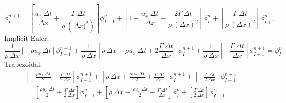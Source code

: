 \documentclass[12pt]{article}
\begin{document}
\begin{equation*}
    \phi_{I}^{n+1} = \left[ \frac{u_x\: \Delta t}{\Delta x} + \frac{\Gamma\: \Delta t}{\rho\: \left(\Delta x)^2\right)} \right] \phi_{I-1}^{n} + \left[ 1 - \frac{u_x\: \Delta t}{\Delta x} - \frac{2\Gamma\: \Delta t}{\rho\: \left(\Delta x\right)^2} \right] \phi_{I}^{n} + \left[ \frac{\Gamma\:\Delta t}{\rho\: \left(\Delta x\right)^2} \right]\phi_{I+1}^{n}
\end{equation*}
Implicit Euler:
\begin{equation*}
    \frac{1}{\rho \:\Delta x}\left[ -\rho u_x\: \Delta t \right]\phi_{I-1}^{n+1} + \frac{1}{\rho \:\Delta x}\left[ \rho \:\Delta x + \rho u_x\: \Delta t + 2\frac{\Gamma\: \Delta t}{\Delta x} \right]\phi_{I}^{n+1} + \frac{1}{\rho \:\Delta x}\left[ -\frac{\Gamma\: \Delta t}{\Delta x} \right]\phi_{I+1}^{n+1} = \phi_{I}^{n}
\end{equation*}
Trapezoidal:
\begin{multline*}
    \left[ -\frac{\rho u_x\: \Delta t}{2} - \frac{\Gamma\: \Delta t}{2\: \Delta x} \right]\phi_{I-1}^{n+1} + \left[ \rho \:\Delta x + \frac{\rho u_x\: \Delta t}{2} + \frac{\Gamma\: \Delta t}{\Delta x} \right]\phi_{I}^{n+1} + \left[ -\frac{\Gamma\: \Delta t}{2\: \Delta x} \right]\phi_{I+1}^{n+1}\\
    = \left[ \frac{\rho u_x\: \Delta t}{2} + \frac{\Gamma\: \Delta t}{2\: \Delta x} \right]\phi_{I-1}^{n} + \left[ \rho \:\Delta x - \frac{\rho u_x\: \Delta t}{2} - \frac{\Gamma\: \Delta t}{\Delta x} \right]\phi_{I}^{n} + \left[ \frac{\Gamma\: \Delta t}{2\: \Delta x} \right]\phi_{I+1}^{n}
\end{multline*}
\end{document}
